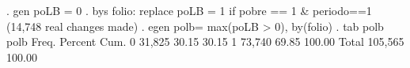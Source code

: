 . gen poLB = 0
{\smallskip}
. bys folio: replace poLB = 1 if pobre == 1 \& periodo==1
(14,748 real changes made)
{\smallskip}
. egen polb= max(poLB > 0), by(folio)
{\smallskip}
. tab polb
{\smallskip}
       polb {\VBAR}      Freq.     Percent        Cum.
          0 {\VBAR}     31,825       30.15       30.15
          1 {\VBAR}     73,740       69.85      100.00
      Total {\VBAR}    105,565      100.00
{\smallskip}
